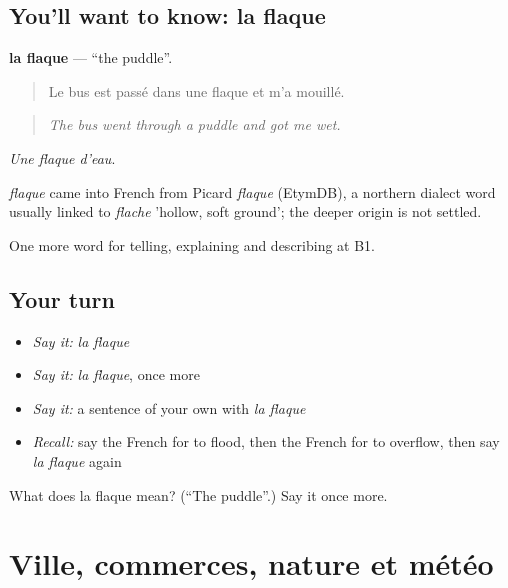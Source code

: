 \subsection*{You'll want to know: la flaque}
\textbf{la flaque} — \textquotedblleft{}the puddle\textquotedblright{}.

\begin{quote}
Le bus est passé dans une flaque et m'a mouillé.
\end{quote}

\begin{quote}
\emph{The bus went through a puddle and got me wet.}
\end{quote}

\emph{Une flaque d'eau}.

\begin{cousinweb}
\emph{flaque} came into French from Picard \emph{flaque} (EtymDB), a northern dialect word usually linked to \emph{flache} 'hollow, soft ground'; the deeper origin is not settled.
\end{cousinweb}

\begin{grammarlens}[title={What you've built}]
One more word for telling, explaining and describing at B1.
\end{grammarlens}

\subsection*{Your turn}
\begin{itemize}
\raggedright
  \item \emph{Say it:} \emph{la flaque}
  \item \emph{Say it:} \emph{la flaque}, once more
  \item \emph{Say it:} a sentence of your own with \emph{la flaque}
  \item \emph{Recall:} say the French for to flood, then the French for to overflow, then say \emph{la flaque} again
\end{itemize}

\begin{tcolorbox}[breakable,colback=teal!4,colframe=teal!35!black,title={Before you move on}]
What does la flaque mean? (\textquotedblleft{}The puddle\textquotedblright{}.) Say it once more.
\end{tcolorbox}
\section[(dialogue)]{Ville, commerces, nature et météo}


